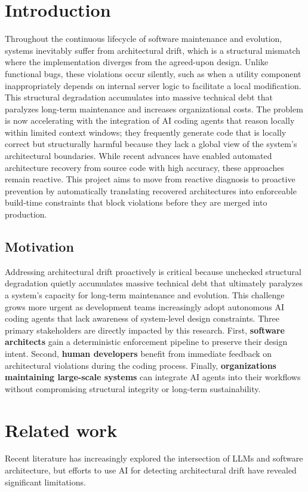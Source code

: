 \documentclass[sigconf,screen]{acmart}
\begin{document}
\section{Introduction}
Throughout the continuous lifecycle of software maintenance and evolution, systems inevitably suffer from architectural drift, which is a structural mismatch where the implementation diverges from the agreed-upon design. Unlike functional bugs, these violations occur silently, such as when a utility component inappropriately depends on internal server logic to facilitate a local modification. This structural degradation accumulates into massive technical debt that paralyzes long-term maintenance and increases organizational costs. The problem is now accelerating with the integration of AI coding agents that reason locally within limited context windows; they frequently generate code that is locally correct but structurally harmful because they lack a global view of the system's architectural boundaries. While recent advances have enabled automated architecture recovery from source code with high accuracy, these approaches remain reactive. This project aims to move from reactive diagnosis to proactive prevention by automatically translating recovered architectures into enforceable build-time constraints that block violations before they are merged into production.

\subsection{Motivation}
Addressing architectural drift proactively is critical because unchecked structural degradation quietly accumulates massive technical debt that ultimately paralyzes a system's capacity for long-term maintenance and evolution. This challenge grows more urgent as development teams increasingly adopt autonomous AI coding agents that lack awareness of system-level design constraints. Three primary stakeholders are directly impacted by this research. First, \textbf{software architects} gain a deterministic enforcement pipeline to preserve their design intent. Second, \textbf{human developers} benefit from immediate feedback on architectural violations during the coding process. Finally, \textbf{organizations maintaining large-scale systems} can integrate AI agents into their workflows without compromising structural integrity or long-term sustainability.

\section{Related work}
Recent literature has increasingly explored the intersection of LLMs and software architecture, but efforts to use AI for detecting architectural drift have revealed significant limitations.
\end{document}
